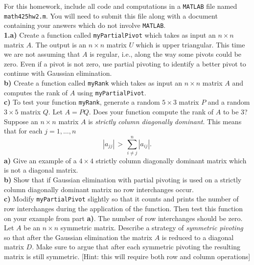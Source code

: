\documentclass[11pt]{amsart}
\theoremstyle{definition}  %
\begin{document}


\noindent For this homework, include all code and computations in a {\tt MATLAB} file named {\tt math425hw2.m}.
You will need to submit this file along with a document containing your answers which do not
involve {\tt MATLAB}.\\


\noindent
{\bf 1.a)} Create a function called {\tt myPartialPivot} which takes as input an $n \times n$ matrix $A$. The output is an $n \times n$
matrix $U$ which is upper triangular.  This time we are not assuming that $A$ is regular, i.e., along the way some pivots could be zero. Even if a pivot
is not zero, use partial pivoting to identify a better pivot to continue with Gaussian elimination. \\
{\bf b)} Create a function called {\tt myRank} which takes as input an $n \times n$ matrix $A$ and computes the rank of $A$ using {\tt myPartialPivot}.\\
{\bf c)}  To test your function {\tt myRank}, generate a random $5 \times 3$ matrix $P$ and a random $3 \times 5$ matrix $Q$. Let $A = PQ$. Does your function
compute the rank of $A$ to be $3$?\\

 Suppose an $n \times n$ matrix $A$ is {\it strictly column diagonally dominant}. This means that for each $j=1,\ldots, n$
$$ |a_{jj} | \, > \, \sum_{i \neq j}^n |a_{ij}|. $$ 
{\bf a)} Give an example of a $ 4 \times 4$ strictly column diagonally dominant matrix which is not a diagonal matrix. \\
{\bf b)} Show that if Gaussian elimination with partial pivoting is used on a strictly column diagonally dominant matrix no row interchanges occur. \\
{\bf c)} Modify {\tt myPartialPivot}  slightly so that it counts and prints the number of row interchanges during the application of the function.  Then 
test this function on your example from part {\bf a)}. The number of row interchanges should be zero. \\

 Let $A$ be an $n \times n$ symmetric matrix. Describe a strategy of {\it symmetric pivoting} so that after the Gaussian elimination the matrix
$A$ is reduced to a diagonal matrix $D$. Make sure to argue that after each symmetric pivoting the resulting matrix is still symmetric. [Hint: this will require both row and
column operations]\\


 
\end{document}
